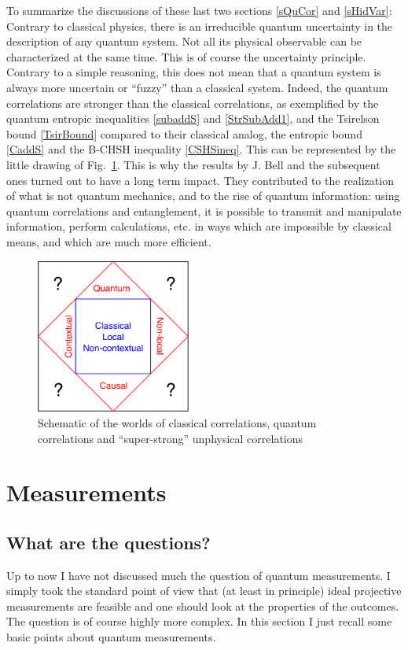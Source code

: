 \medskip
To summarize the discussions of these last two sections \ref{sQuCor} and \ref{sHidVar}: 
Contrary to classical physics, there is an irreducible quantum uncertainty in the description of any quantum system. Not all its physical observable can be characterized at the same time. This is of course the uncertainty principle.
Contrary to a simple reasoning, this does not mean that a quantum system is always more uncertain or ``fuzzy''  than a classical system. Indeed, the quantum correlations are stronger than the classical correlations, as exemplified by the quantum entropic inequalities \ref{subaddS} and 
\ref{StrSubAdd1}, and the Tsirelson bound \ref{TsirBound} compared to their classical analog, the entropic bound \ref{CaddS} and the B-CHSH inequality \ref{CSHSineq}.
This can be represented by the little drawing of Fig.~\ref{QYantra}.
This is why the results by J. Bell and the subsequent ones turned out to have a long term impact. They contributed to the realization of what is not quantum mechanics, and to the rise of quantum information: using quantum correlations and entanglement, it is possible to  transmit and manipulate information, perform calculations, etc.  in ways which are impossible by classical means, and which are much more efficient.

\begin{figure}[h]
\begin{center}
\includegraphics[width=2in]{quantum-yantra.pdf}
\caption{Schematic of the worlds of classical correlations, quantum correlations  and ``super-strong'' unphysical correlations}
\label{QYantra}
\end{center}
\end{figure}



\section{Measurements}
\label{sMeasure}
\subsection{What are the questions?}
Up to now I have not  discussed much the question of quantum measurements.
I simply took the standard point of view that  (at least in principle) ideal projective measurements are feasible and one should look at the properties of the outcomes. 
The question is of course highly more complex. In this section I just recall some basic points about quantum measurements.


